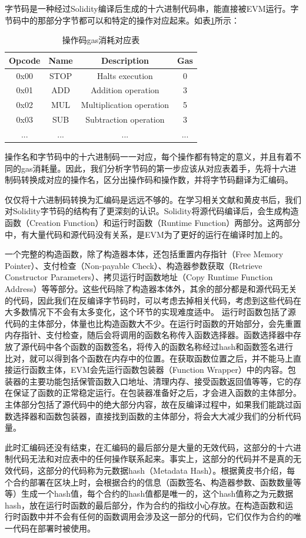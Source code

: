 字节码是一种经过Solidity编译后生成的十六进制代码串，能直接被EVM运行。字节码中的那部分字节都可以和特定的操作对应起来。如表\ref{tab:opcode_gas}所示：

\begin{table}
  \centering\small
  \caption{操作码gas消耗对应表}
    \begin{tabular}{cccc}
      \toprule
      Opcode & Name & Description & Gas \\
      \midrule
      0x00 & STOP & Halts execution & 0 \\
      0x01 & ADD & Addition operation & 3 \\
      0x02 & MUL & Multiplication operation & 5 \\
      0x03 & SUB & Subtraction operation & 3 \\
      ... & ... & ... & ... \\
      \bottomrule
    \end{tabular}
  \label{tab:opcode_gas}
\end{table}

操作名和字节码中的十六进制码一一对应，每个操作都有特定的意义，并且有着不同的gas消耗量。因此，我们分析字节码的第一步应该从对应表着手，先将十六进制码转换成对应的操作名，区分出操作码和操作数，并将字节码翻译为汇编码。

仅仅将十六进制码转换为汇编码是远远不够的。在学习相关文献和黄皮书后，我们对Solidity字节码的结构有了更深刻的认识。Solidity将源代码编译后，会生成构造函数（Creation Function）和运行时函数（Runtime Function）两部分。这两部分中，有大量代码和源代码没有关系，是EVM为了更好的运行在编译时加上的。

一个完整的构造函数，除了构造器本体，还包括重置内存指针（Free Memory Pointer）、支付检查（Non-payable Check）、构造器参数获取（Retrieve Constructor Parameters）、拷贝运行时函数地址（Copy Runtime Function Address）等等部分。这些代码除了构造器本体外，其余的部分都是和源代码无关的代码，因此我们在反编译字节码时，可以考虑去掉相关代码，考虑到这些代码在大多数情况下不会有太多变化，这个环节的实现难度适中。
运行时函数包括了源代码的主体部分，体量也比构造函数大不少。在运行时函数的开始部分，会先重置内存指针、支付检查，随后会将调用的函数名称传入函数选择器。函数选择器中存放了源代码中各个函数的函数签名，将传入的函数名称经过hash和函数签名进行比对，就可以得到各个函数在内存中的位置。在获取函数位置之后，并不能马上直接运行函数主体，EVM会先运行函数包装器（Function Wrapper）中的内容。包装器的主要功能包括保管函数入口地址、清理内存、接受函数返回值等等，它的存在保证了函数的正常稳定运行。在包装器准备好之后，才会进入函数的主体部分。主体部分包括了源代码中的绝大部分内容，故在反编译过程中，如果我们能跳过函数选择器和函数包装器，直接找到函数的主体部分，将会大大减少我们的分析代码量。

此时汇编码还没有结束，在汇编码的最后部分是大量的无效代码，这部分的十六进制代码无法和对应表中的任何操作联系起来。事实上，这部分的代码并不是真的无效代码，这部分的代码称为元数据hash（Metadata Hash）。根据黄皮书介绍，每个合约部署在区块上时，会根据合约的信息（函数签名、构造器参数、函数数量等等）生成一个hash值，每个合约的hash值都是唯一的，这个hash值称之为元数据hash，放在运行时函数的最后部分，作为合约的指纹小心存放。在构造函数和运行时函数中并不会有任何的函数调用会涉及这一部分的代码，它们仅作为合约的唯一代码在部署时被使用。
